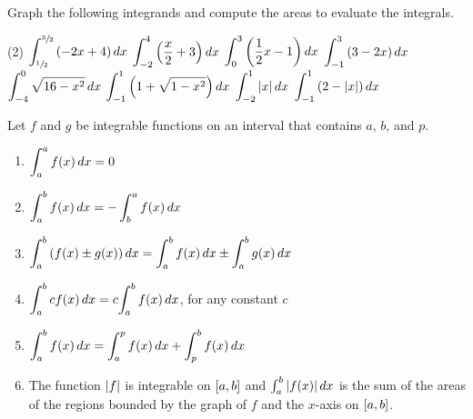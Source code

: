 \documentclass[mathNotesPreamble]{subfiles}
\begin{document}
\begin{ex*}
  Graph the following integrands and compute the areas to evaluate the integrals.
\end{ex*}
\begin{tasks}[after-item-skip=\stretch{1}](2)
  \task $\displaystyle\int_{\sfrac{1}{2}}^{\sfrac{3}{2}} {\left(-2x+4\right)}\,dx$
  \task $\displaystyle\int_{-2}^{4} {\left(\frac{x}{2}+3\right)}\,dx$
  \task $\displaystyle\int_{0}^{3} {\left(\frac{1}{2}x-1\right)}\,dx$
  \task $\displaystyle\int_{-1}^{3} {\left(3-2x\right)}\,dx$
  \task $\displaystyle\int_{-4}^{0} \sqrt{16-x^2}\,dx$
  \task $\displaystyle\int_{-1}^{1} {\left(1+\sqrt{1-x^2}\right)}\,dx$
  \task $\displaystyle\int_{-2}^{1} {\left\vert x\right\vert}\,dx$
  \task $\displaystyle\int_{-1}^{1} {\left(2-{\left\vert x\right\vert}\right)}\,dx$
\end{tasks}

\pagebreak

\begin{thmBox*}
  Let $f$ and $g$ be integrable functions on an interval that contains $a$, $b$, and $p$.
  
  \begin{enumerate}
    \item $\displaystyle\int_a^a f(x)\,dx=0$
    \item $\displaystyle\int_a^b f(x)\,dx=-\int_b^a f(x)\,dx$
    \item $\displaystyle\int_a^b {\left(f(x)\pm g(x)\right)}\,dx=\int_a^b f(x)\,dx\pm \int_a^b g(x)\,dx$
    \item $\displaystyle\int_a^b c\,\!f(x)\,dx=c\!\int_a^b f(x)\,dx$, for any constant $c$
    \item $\displaystyle\int_a^b f(x)\,dx=\int_a^p f(x)\,dx+\int_p^b f(x)\,dx$
    \item The function ${\left\vert f\right\vert}$ is integrable on ${\left[a,b\right]}$ and $\int_a^b{\left\vert f(x)\right\vert}\,dx$ is the sum of the areas of the regions bounded by the graph of $f$ and the $x$-axis on ${\left[a,b\right]}$.
    \vspace*{-0.5\baselineskip}
  \end{enumerate}
\end{thmBox*}
\end{document}
